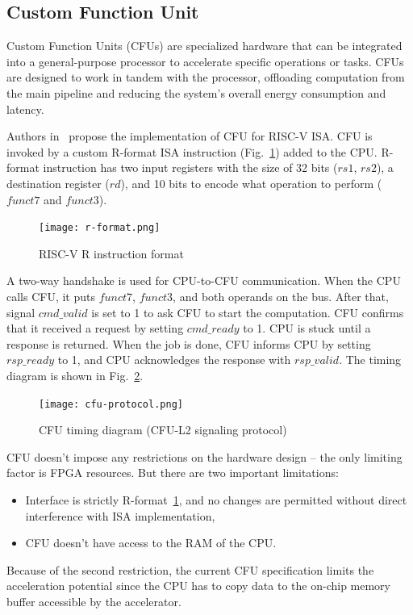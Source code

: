 \subsection{Custom Function Unit}

Custom Function Units (CFUs) are specialized hardware that can be integrated into a general-purpose processor to accelerate specific operations or tasks. CFUs are designed to work in tandem with the processor, offloading computation from the main pipeline and reducing the system's overall energy consumption and latency. 

Authors in~\cite{risc_v_cfu} propose the implementation of CFU for RISC-V ISA. CFU is invoked by a custom R-format ISA instruction (Fig.~\ref{fig:r-format}) added to the CPU. R-format instruction has two input registers with the size of 32 bits ($rs1$, $rs2$), a destination register ($rd$), and 10 bits to encode what operation to perform ($funct7$ and $funct3$). 

\begin{figure}[t]
\centering
\caption{RISC-V R instruction format~\cite{risc_v_manual}}
\texttt{[image: r-format.png]}
\label{fig:r-format}
\end{figure}

A two-way handshake is used for CPU-to-CFU communication. When the CPU calls CFU, it puts $funct7$, $funct3$, and both operands on the bus. After that, signal $cmd\_valid$ is set to 1 to ask CFU to start the computation. CFU confirms that it received a request by setting $cmd\_ready$ to 1. CPU is stuck until a response is returned. When the job is done, CFU informs CPU by setting $rsp\_ready$ to 1, and CPU acknowledges the response with $rsp\_valid$. The timing diagram is shown in Fig.~\ref{fig:cfu-timing}.

\begin{figure}[t]
\centering
\caption{CFU timing diagram (CFU-L2 signaling protocol)~\cite{risc_v_cfu}}
\texttt{[image: cfu-protocol.png]}
\label{fig:cfu-timing}
\end{figure}

CFU doesn't impose any restrictions on the hardware design -- the only limiting factor is FPGA resources. But there are two important limitations:
\begin{itemize}
    \item Interface is strictly R-format~\ref{fig:r-format}, and no changes are permitted without direct interference with ISA implementation,
    \item CFU doesn't have access to the RAM of the CPU.
\end{itemize}
Because of the second restriction, the current CFU specification limits the acceleration potential since the CPU has to copy data to the on-chip memory buffer accessible by the accelerator. 

